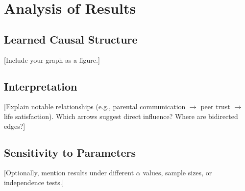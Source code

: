 \documentclass[main.tex]{subfiles}
\begin{document}
\section{Analysis of Results}

\subsection{Learned Causal Structure}
[Include your graph as a figure.]


\subsection{Interpretation}
[Explain notable relationships (e.g., parental communication $\rightarrow$ peer trust $\rightarrow$ life satisfaction). Which arrows suggest direct influence? Where are bidirected edges?]

\subsection{Sensitivity to Parameters}
[Optionally, mention results under different $\alpha$ values, sample sizes, or independence tests.]
\end{document}
